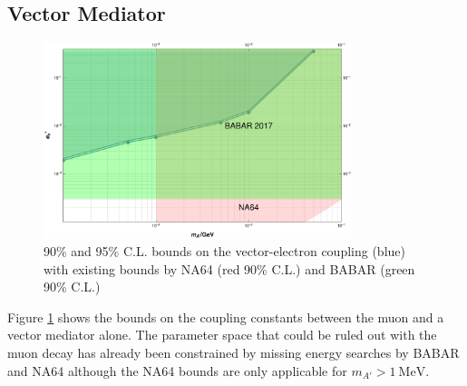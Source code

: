 \subsection{Vector Mediator}

\begin{figure}[H]
  \centering
    \includegraphics[width=0.8\textwidth]{imgs/MuBoundOnVectorElectron.pdf}
    \caption{90\% and 95\% C.L. bounds on the vector-electron coupling (blue) with existing bounds by NA64 (red 90\% C.L.) and BABAR (green 90\% C.L.)}
    \label{fg:MuBoundVeEl}
\end{figure}
Figure \ref{fg:MuBoundVeEl} shows the bounds on the coupling constants between the muon and a vector mediator alone. The parameter space that could be ruled out with the muon decay has already been constrained by missing energy searches by BABAR and NA64 although the NA64 bounds are only applicable for $m_{A'}>\SI{1}{\mega \eV}$.

